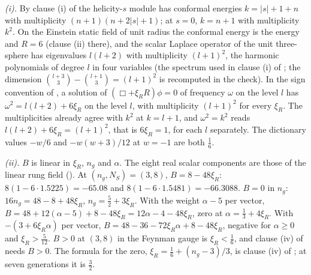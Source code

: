 \emph{(i).} By clause (i) of  the helicity-$s$ module has conformal energies $k = |s| + 1 + n$ with multiplicity $(n + 1)(n + 2|s| + 1)$; at $s = 0$, $k = n + 1$ with multiplicity $k^{2}$. On the Einstein static field of unit radius the conformal energy is the energy and $R = 6$ (clause (ii) there), and the scalar Laplace operator of the unit three-sphere has eigenvalues $l(l + 2)$ with multiplicity $(l + 1)^{2}$, the harmonic polynomials of degree $l$ in four variables (the spectrum used in clause (i) of ; the dimension $\binom{l+3}{3} - \binom{l+1}{3} = (l+1)^{2}$ is recomputed in the check). In the sign convention of , a solution of $(\Box + \xi_{R}R)\phi = 0$ of frequency $\omega$ on the level $l$ has $\omega^{2} = l(l + 2) + 6\xi_{R}$ on the level $l$, with multiplicity $(l + 1)^{2}$ for every $\xi_{R}$. The multiplicities already agree with $k^{2}$ at $k = l + 1$, and $\omega^{2} = k^{2}$ reads $l(l + 2) + 6\xi_{R} = (l + 1)^{2}$, that is $6\xi_{R} = 1$, for each $l$ separately. The dictionary values $-w/6$ and $-w(w + 3)/12$ at $w = -1$ are both $\tfrac16$.

\emph{(ii).} $B$ is linear in $\xi_{R}$, $n_{g}$ and $\alpha$. The eight real scalar components are those of the linear rung field (). At $(n_{g}, N_{S}) = (3, 8)$, $B = 8 - 48\xi_{R}$: $8(1 - 6\cdot1.5225) = -65.08$ and $8(1 - 6\cdot1.5481) = -66.3088$. $B = 0$ in $n_{g}$: $16n_{g} = 48 - 8 + 48\xi_{R}$, $n_{g} = \tfrac52 + 3\xi_{R}$. With the weight $\alpha - 5$ per vector, $B = 48 + 12(\alpha - 5) + 8 - 48\xi_{R} = 12\alpha - 4 - 48\xi_{R}$, zero at $\alpha = \tfrac13 + 4\xi_{R}$. With $-(3 + 6\xi_{R}\alpha)$ per vector, $B = 48 - 36 - 72\xi_{R}\alpha + 8 - 48\xi_{R}$, negative for $\alpha \ge 0$ and $\xi_{R} > \tfrac{5}{12}$. $B > 0$ at $(3, 8)$ in the Feynman gauge is $\xi_{R} < \tfrac16$, and clause (iv) of  needs $B > 0$. The formula for the zero, $\xi_{R} = \tfrac16 + (n_{g} - 3)/3$, is clause (iv) of ; at seven generations it is $\tfrac32$.

